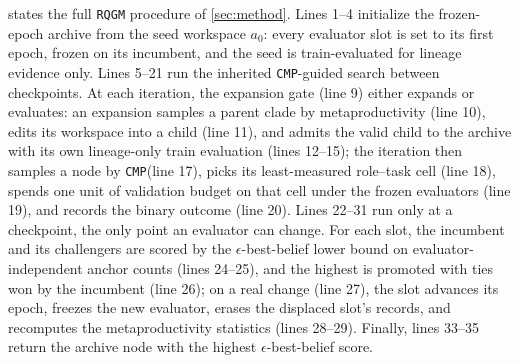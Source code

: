 \documentclass{paper}
\newcommand{\ourmethod}{\texttt{RQGM}\xspace}
\newcommand{\cmp}{\texttt{CMP}\xspace}
\begin{document}
 states the full \ourmethod{} procedure of \cref{sec:method}. Lines 1--4 initialize the frozen-epoch archive from the seed workspace $a_0$: every evaluator slot is set to its first epoch, frozen on its incumbent, and the seed is train-evaluated for lineage evidence only. Lines 5--21 run the inherited \cmp-guided search between checkpoints. At each iteration, the expansion gate (line 9) either expands or evaluates: an expansion samples a parent clade by metaproductivity (line 10), edits its workspace into a child (line 11), and admits the valid child to the archive with its own lineage-only train evaluation (lines 12--15); the iteration then samples a node by \cmp (line 17), picks its least-measured role--task cell (line 18), spends one unit of validation budget on that cell under the frozen evaluators (line 19), and records the binary outcome (line 20). Lines 22--31 run only at a checkpoint, the only point an evaluator can change. For each slot, the incumbent and its challengers are scored by the $\epsilon$-best-belief lower bound on evaluator-independent anchor counts (lines 24--25), and the highest is promoted with ties won by the incumbent (line 26); on a real change (line 27), the slot advances its epoch, freezes the new evaluator, erases the displaced slot's records, and recomputes the metaproductivity statistics (lines 28--29). Finally, lines 33--35 return the archive node with the highest $\epsilon$-best-belief score.
\end{document}
